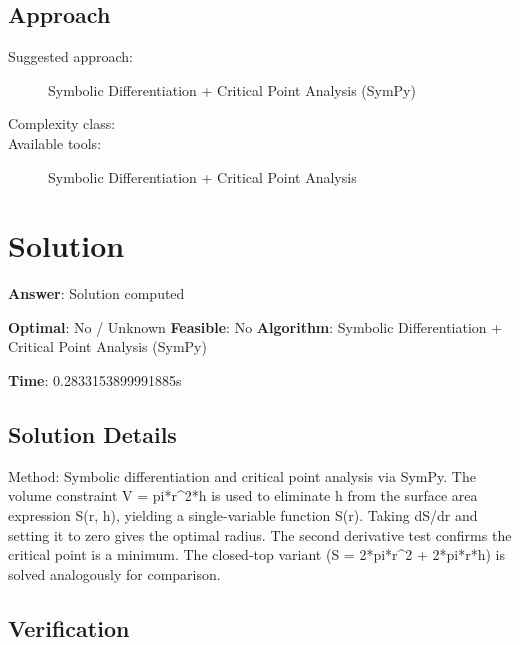 \documentclass[11pt, a4paper]{article}
\begin{document}
\subsection{Approach}

\begin{description}
  \item[Suggested approach:] Symbolic Differentiation + Critical Point Analysis (SymPy)
  \item[Complexity class:] 
  \item[Available tools:] Symbolic Differentiation + Critical Point Analysis
\end{description}
\section{Solution}

\begin{polyaresult}

\textbf{Answer}: Solution computed


\textbf{Optimal}: No / Unknown \hfill
\textbf{Feasible}: No
\textbf{Algorithm}: Symbolic Differentiation + Critical Point Analysis (SymPy) \quad $$

\textbf{Time}: 0.2833153899991885s


\end{polyaresult}

\subsection{Solution Details}


Method: Symbolic differentiation and critical point analysis via SymPy. The volume constraint V = pi*r\textasciicircum{}2*h is used to eliminate h from the surface area expression S(r, h), yielding a single-variable function S(r). Taking dS/dr and setting it to zero gives the optimal radius. The second derivative test confirms the critical point is a minimum. The closed-top variant (S = 2*pi*r\textasciicircum{}2 + 2*pi*r*h) is solved analogously for comparison.

\subsection{Verification}
\end{document}
